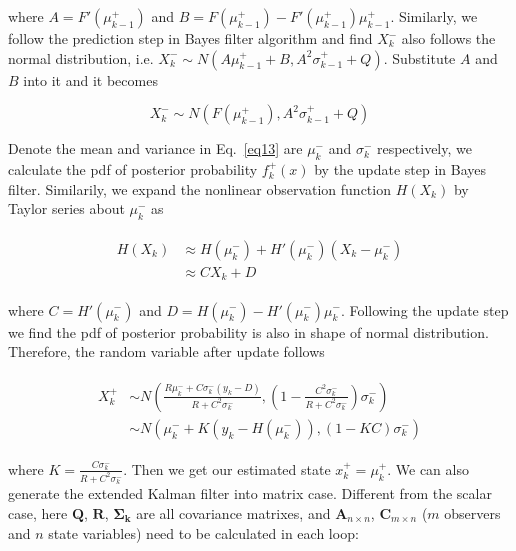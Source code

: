 \documentclass[conference]{IEEEtran}
\begin{document}
	where $A={F}'(\mu_{k-1}^{+})$ and $B=F(\mu_{k-1}^{+})-{F}'(\mu_{k-1}^{+})\mu_{k-1}^{+}$. Similarly, we follow the prediction step in Bayes filter algorithm and find $X_{k}^{-}$ also follows the normal distribution, i.e. $X_{k}^{-} \sim N(A\mu_{k-1}^{+}+B, A^{2}\sigma_{k-1}^{+}+Q)$. Substitute $A$ and $B$ into it and it becomes
	
	\begin{equation}
		X_{k}^{-} \sim N(F(\mu_{k-1}^{+}), A^{2}\sigma_{k-1}^{+}+Q)
		\label{eq13}
	\end{equation}
	
	Denote the mean and variance in Eq.~\ref{eq13} are $\mu_{k}^{-}$ and $\sigma_{k}^{-}$ respectively, we calculate the pdf of posterior probability $f_{k}^{+}(x)$ by the update step in Bayes filter. Similarily, we expand the nonlinear observation function $H(X_{k})$ by Taylor series about $\mu_{k}^{-}$ as
	
	\begin{equation}
	\begin{split}
	\begin{aligned}
	H(X_{k})&\approx H(\mu_{k}^{-})+{H}'(\mu_{k}^{-})(X_{k}-\mu_{k}^{-})\\
	&\approx CX_{k}+D
	\label{eq14}
	\end{aligned}
	\end{split}
	\end{equation}
	
	where $C={H}'(\mu_{k}^{-})$ and $D=H(\mu_{k}^{-})-{H}'(\mu_{k}^{-})\mu_{k}^{-}$. Following the update step we find the pdf of posterior probability is also in shape of normal distribution. Therefore, the random variable after update follows 
	
	\begin{equation}
	\begin{split}
	\begin{aligned}
	X_{k}^{+} &\sim N(\frac{R\mu_{k}^{-}+C\sigma_{k}^{-}(y_{k}-D)}{R+C^{2}\sigma_{k}^{-}}, (1-\frac{C^{2}\sigma_{k}^{-}}{R+C^{2}\sigma_{k}^{-}})\sigma_{k}^{-})\\
	&\sim N(\mu_{k}^{-}+K(y_{k}-H(\mu_{k}^{-})), (1-KC)\sigma_{k}^{-})
	\label{eq15}
	\end{aligned}
	\end{split}
	\end{equation}
	
	where $K=\frac{C\sigma_{k}^{-}}{R+C^{2}\sigma_{k}^{-}}$. Then we get our estimated state $x_{k}^{+}=\mu_{k}^{+}$. We can also generate the extended Kalman filter into matrix case. Different from the scalar case, here $\boldsymbol{Q}$, $\boldsymbol{R}$, $\boldsymbol{\Sigma_{k}}$ are all covariance matrixes, and $\boldsymbol{A}_{n\times n}$, $\boldsymbol{C}_{m\times n}$ ($m$ observers and $n$ state variables) need to be calculated in each loop:
	
\end{document}

